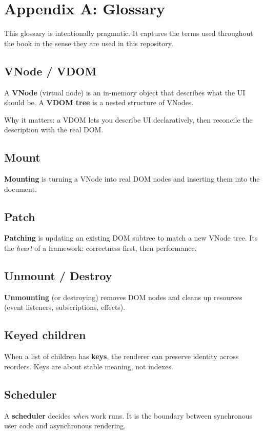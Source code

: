 \chapter{Appendix A: Glossary}

This glossary is intentionally pragmatic.
It captures the terms used throughout the book in the sense they are used in this repository.

\section{VNode / VDOM}
A \textbf{VNode} (virtual node) is an in-memory object that describes what the UI should be.
A \textbf{VDOM tree} is a nested structure of VNodes.

Why it matters: a VDOM lets you describe UI declaratively, then reconcile the description with the real DOM.

\section{Mount}
\textbf{Mounting} is turning a VNode into real DOM nodes and inserting them into the document.

\section{Patch}
\textbf{Patching} is updating an existing DOM subtree to match a new VNode tree.
It\textquotesingle s the \emph{heart} of a framework: correctness first, then performance.

\section{Unmount / Destroy}
\textbf{Unmounting} (or destroying) removes DOM nodes and cleans up resources (event listeners, subscriptions, effects).

\section{Keyed children}
When a list of children has \textbf{keys}, the renderer can preserve identity across reorders.
Keys are about stable meaning, not indexes.

\section{Scheduler}
A \textbf{scheduler} decides \emph{when} work runs.
It is the boundary between synchronous user code and asynchronous rendering.

